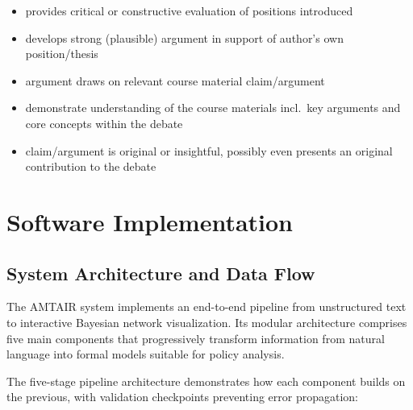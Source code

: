 \documentclass[
  11pt,
  letterpaper,
]{book}
\providecommand{\tightlist}{%
  \setlength{\itemsep}{0pt}\setlength{\parskip}{0pt}}
\begin{document}
\begin{tcolorbox}[enhanced jigsaw, coltitle=black, opacitybacktitle=0.6, titlerule=0mm, colframe=quarto-callout-note-color-frame, breakable, leftrule=.75mm, colback=white, left=2mm, opacityback=0, colbacktitle=quarto-callout-note-color!10!white, bottomtitle=1mm, toptitle=1mm, title=\textcolor{quarto-callout-note-color}{\faInfo}\hspace{0.5em}{20\% of Grade: \textasciitilde{} 29\% of text \textasciitilde{} 8700
words \textasciitilde{} 20 pages}, arc=.35mm, bottomrule=.15mm, rightrule=.15mm, toprule=.15mm]

\begin{itemize}
\tightlist
\item
  provides critical or constructive evaluation of positions introduced
\item
  develops strong (plausible) argument in support of author's own
  position/thesis
\item
  argument draws on relevant course material claim/argument
\item
  demonstrate understanding of the course materials incl.~key arguments
  and core concepts within the debate
\item
  claim/argument is original or insightful, possibly even presents an
  original contribution to the debate
\end{itemize}

\end{tcolorbox}

\section{Software Implementation}\label{sec-software-implementation}

\subsection{System Architecture and Data
Flow}\label{sec-system-architecture}

The AMTAIR system implements an end-to-end pipeline from unstructured
text to interactive Bayesian network visualization. Its modular
architecture comprises five main components that progressively transform
information from natural language into formal models suitable for policy
analysis.

The five-stage pipeline architecture demonstrates how each component
builds on the previous, with validation checkpoints preventing error
propagation:
\end{document}
